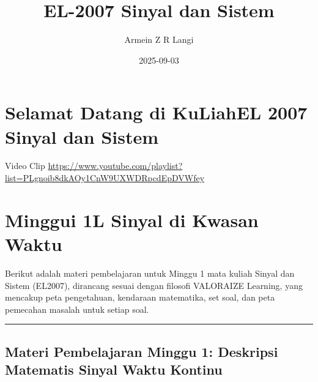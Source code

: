 \documentclass[
  letterpaper,
  DIV=11,
  numbers=noendperiod]{scrreprt}
\title{EL-2007 Sinyal dan Sistem}
\author{Armein Z R Langi}
\date{2025-09-03}
\renewcommand*\contentsname{Table of contents}
\newcommand\contentsname{Table of contents}
\begin{document}
\maketitle

\renewcommand*\contentsname{Table of contents}
{
\hypersetup{linkcolor=}
\setcounter{tocdepth}{2}
\tableofcontents
}


\chapter*{Selamat Datang di KuLiahEL 2007 Sinyal dan
Sistem}\label{selamat-datang-di-kuliahel-2007-sinyal-dan-sistem}


Video Clip
\url{https://www.youtube.com/playlist?list=PLgnoib8dkAOy1CnW9UXWDRpcdEpDVWfey}


\chapter{}\label{section}


\chapter{Minggui 1L Sinyal di Kwasan
Waktu}\label{minggui-1l-sinyal-di-kwasan-waktu}

Berikut adalah materi pembelajaran untuk Minggu 1 mata kuliah Sinyal dan
Sistem (EL2007), dirancang sesuai dengan filosofi VALORAIZE Learning,
yang mencakup peta pengetahuan, kendaraan matematika, set soal, dan peta
pemecahan masalah untuk setiap soal.

\begin{center}\rule{0.5\linewidth}{0.5pt}\end{center}

\section{Materi Pembelajaran Minggu 1: Deskripsi Matematis Sinyal Waktu
Kontinu}\label{materi-pembelajaran-minggu-1-deskripsi-matematis-sinyal-waktu-kontinu}
\end{document}
